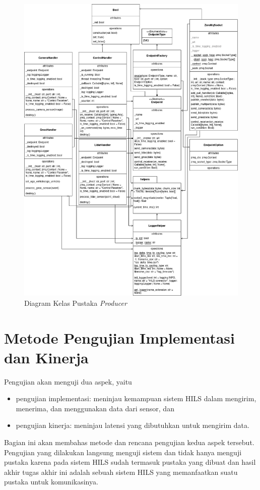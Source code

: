 \begin{figure}[h!]
    \centering
    \includegraphics[width=1.0\textwidth]{resources/chapter-4/producer-class_diagram.png}
	\caption{Diagram Kelas Pustaka \textit{Producer}}
    \label{chapter-4-producer-class-diagram}
\end{figure}

\section{Metode Pengujian Implementasi dan Kinerja}

Pengujian akan menguji dua aspek, yaitu
\begin{itemize}
	\item pengujian implementasi: meninjau kemampuan sistem HILS dalam mengirim,
		menerima, dan menggunakan data dari sensor, dan
	\item pengujian kinerja: meninjau latensi yang dibutuhkan untuk mengirim
		data.
\end{itemize}
Bagian ini akan membahas metode dan rencana pengujian kedua aspek tersebut.
Pengujian yang dilakukan langsung menguji sistem dan tidak hanya menguji pustaka
karena pada sistem HILS sudah termasuk pustaka yang dibuat dan hasil akhir
tugas akhir ini adalah sebuah sistem HILS yang memanfaatkan suatu pustaka untuk
komunikasinya.

